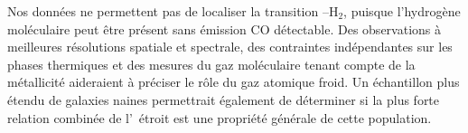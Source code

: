 Nos données ne permettent pas de localiser la transition \HI--H$_2$, puisque l'hydrogène moléculaire peut être présent sans émission CO détectable. Des observations à meilleures résolutions spatiale et spectrale, des contraintes indépendantes sur les phases thermiques et des mesures du gaz moléculaire tenant compte de la métallicité aideraient à préciser le rôle du gaz atomique froid. Un échantillon plus étendu de galaxies naines permettrait également de déterminer si la plus forte relation combinée de l'\HI\ étroit est une propriété générale de cette population.
